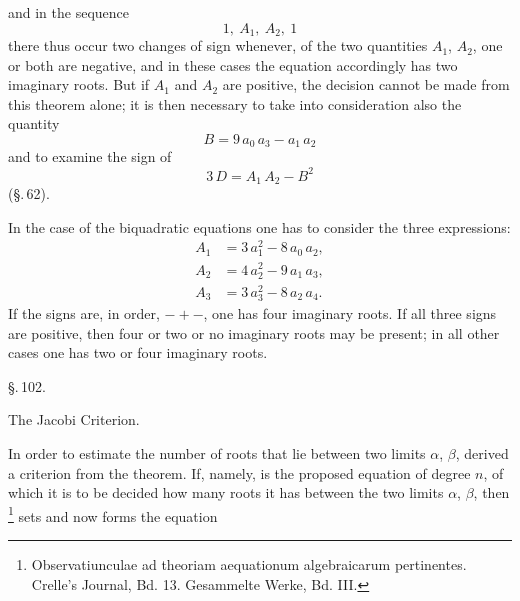 and in the sequence
\[
1,\ A_1,\ A_2,\ 1
\]
there thus occur two changes of sign whenever, of the two quantities $A_1$, $A_2$, one or both are negative, and in these cases the equation accordingly has two imaginary roots. But if $A_1$ and $A_2$ are positive, the decision cannot be made from this theorem alone; it is then necessary to take into consideration also the quantity
\[
B = 9\,a_0\,a_3 - a_1\,a_2
\]
and to examine the sign of
\[
3\,D = A_1\,A_2 - B^2
\]
(\S.\,62).

In the case of the biquadratic equations one has to consider the three expressions:
\[
\begin{aligned}
A_1 &= 3\,a_1^2 - 8\,a_0\,a_2,\\
A_2 &= 4\,a_2^2 - 9\,a_1\,a_3,\\
A_3 &= 3\,a_3^2 - 8\,a_2\,a_4.
\end{aligned}
\]
If the signs are, in order, $-+-$, one has four imaginary roots. If all three signs are positive, then four or two or no imaginary roots may be present; in all other cases one has two or four imaginary roots.

\begin{center}
\S.\,102.

The Jacobi Criterion.
\end{center}

In order to estimate the number of roots that lie between two limits $\alpha$, $\beta$,  derived a criterion from the  theorem. If, namely,
is the proposed equation of degree $n$, of which it is to be decided how many roots it has between the two limits $\alpha$, $\beta$, then \footnote{Observatiunculae ad theoriam aequationum algebraicarum pertinentes. Crelle's Journal, Bd. 13. Gesammelte Werke, Bd. III.} sets
and now forms the equation
